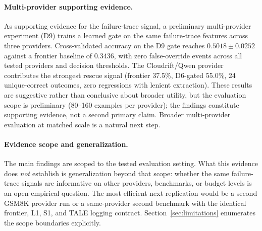 \paragraph{Multi-provider supporting evidence.}
As supporting evidence for the failure-trace signal,
a preliminary multi-provider experiment (D9) trains a learned gate on the same
failure-trace features across three providers.
Cross-validated accuracy on the D9 gate reaches $0.5018 \pm 0.0252$ against a
frontier baseline of $0.3436$, with zero false-override events across all tested
providers and decision thresholds.
The Cloudrift/Qwen provider contributes the strongest rescue signal
(frontier 37.5\%, D6-gated 55.0\%, 24 unique-correct outcomes, zero
regressions with lenient extraction).
These results are suggestive rather than conclusive about broader utility, but
the evaluation scope is preliminary (80--160 examples per provider); the
findings constitute supporting evidence, not a second primary claim.
Broader multi-provider evaluation at matched scale is a natural next step.

\paragraph{Evidence scope and generalization.}
The main findings are scoped to the tested evaluation setting.
What this evidence does \emph{not} establish is generalization beyond that
scope: whether the same failure-trace signals are informative on other
providers, benchmarks, or budget levels is an open empirical question.
The most efficient next replication would be a second GSM8K provider run or a
same-provider second benchmark with the identical frontier, L1, S1, and TALE
logging contract.
Section~\ref{sec:limitations} enumerates the scope boundaries explicitly.

